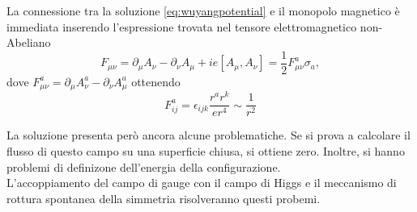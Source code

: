 La connessione tra la soluzione \ref{eq:wuyangpotential} e il monopolo magnetico
è immediata inserendo l'espressione trovata nel tensore elettromagnetico non-Abeliano
\begin{equation}
   F_{\mu\nu} = \partial _\mu A_\nu - \partial _\nu A _\mu + i e [A_\mu,A_\nu]
              = \frac{1}{2} F_{\mu\nu}^a \sigma _a ,
\end{equation}
dove $F_{\mu\nu}^a = \partial _\mu A_\nu^a - \partial _\nu A_\mu^a$
ottenendo
\begin{equation}
   F^a_{ij} = \epsilon_{ijk} \frac{r^a r^k}{e r^4} \sim \frac{1}{r^2}
\end{equation}

La soluzione presenta però ancora alcune problematiche. Se si prova a calcolare
il flusso di questo campo su una superficie chiusa, si ottiene zero. Inoltre, si
hanno problemi di definizone dell'energia della configurazione.\\

L'accoppiamento del campo di gauge con il campo di Higgs e il meccanismo di
rottura spontanea della simmetria risolveranno questi probemi.
